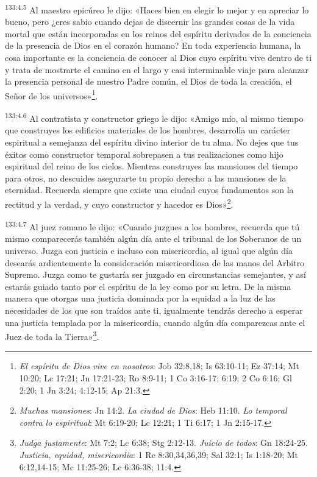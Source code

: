 \par 
\textsuperscript{133:4.5} Al maestro epicúreo le dijo: «Haces bien en elegir lo mejor y en apreciar lo bueno, pero ¿eres sabio cuando dejas de discernir las grandes cosas de la vida mortal que están incorporadas en los reinos del espíritu derivados de la conciencia de la presencia de Dios en el corazón humano? En toda experiencia humana, la cosa importante es la conciencia de conocer al Dios cuyo espíritu vive dentro de ti y trata de mostrarte el camino en el largo y casi interminable viaje para alcanzar la presencia personal de nuestro Padre común, el Dios de toda la creación, el Señor de los universos»\footnote{\textit{El espíritu de Dios vive en nosotros}: Job 32:8,18; Is 63:10-11; Ez 37:14; Mt 10:20; Lc 17:21; Jn 17:21-23; Ro 8:9-11; 1 Co 3:16-17; 6:19; 2 Co 6:16; Gl 2:20; 1 Jn 3:24; 4:12-15; Ap 21:3.}.

\par 
\textsuperscript{133:4.6} Al contratista y constructor griego le dijo: «Amigo mío, al mismo tiempo que construyes los edificios materiales de los hombres, desarrolla un carácter espiritual a semejanza del espíritu divino interior de tu alma. No dejes que tus éxitos como constructor temporal sobrepasen a tus realizaciones como hijo espiritual del reino de los cielos. Mientras construyes las mansiones del tiempo para otros, no descuides asegurarte tu propio derecho a las mansiones de la eternidad. Recuerda siempre que existe una ciudad cuyos fundamentos son la rectitud y la verdad, y cuyo constructor y hacedor es Dios»\footnote{\textit{Muchas mansiones}: Jn 14:2. \textit{La ciudad de Dios}: Heb 11:10. \textit{Lo temporal contra lo espiritual}: Mt 6:19-20; Lc 12:21; 1 Ti 6:17; 1 Jn 2:15-17.}.

\par 
\textsuperscript{133:4.7} Al juez romano le dijo: «Cuando juzgues a los hombres, recuerda que tú mismo comparecerás también algún día ante el tribunal de los Soberanos de un universo. Juzga con justicia e incluso con misericordia, al igual que algún día desearás ardientemente la consideración misericordiosa de las manos del Arbitro Supremo. Juzga como te gustaría ser juzgado en circunstancias semejantes, y así estarás guiado tanto por el espíritu de la ley como por su letra. De la misma manera que otorgas una justicia dominada por la equidad a la luz de las necesidades de los que son traídos ante ti, igualmente tendrás derecho a esperar una justicia templada por la misericordia, cuando algún día comparezcas ante el Juez de toda la Tierra»\footnote{\textit{Judga justamente}: Mt 7:2; Lc 6:38; Stg 2:12-13. \textit{Juicio de todos}: Gn 18:24-25. \textit{Justicia, equidad, misericordia}: 1 Re 8:30,34,36,39; Sal 32:1; Is 1:18-20; Mt 6:12,14-15; Mc 11:25-26; Lc 6:36-38; 11:4.}.

